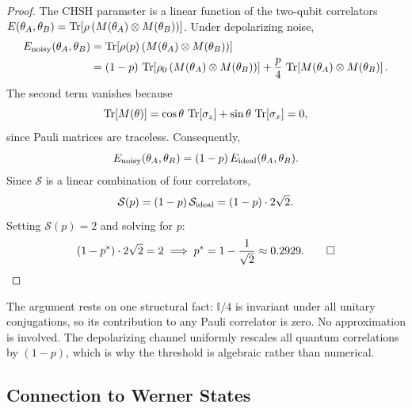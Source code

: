 \documentclass[12pt]{article}
\newcommand{\pstar}{p^*}
\newcommand{\bigS}{\mathcal{S}}
\newcommand{\Id}{\mathbb{I}}
\begin{document}
\begin{proof}
The CHSH parameter is a linear function of the two-qubit correlators
$E(\theta_A,\theta_B) = \Tr[\rho\,(M(\theta_A)\otimes M(\theta_B))]$.
Under depolarizing noise,
\begin{align}
  E_{\rm noisy}(\theta_A,\theta_B)
    &= \Tr\!\left[\rho(p)\,(M(\theta_A)\otimes M(\theta_B))\right] \notag\\
    &= (1-p)\,\Tr\!\left[\rho_0\,(M(\theta_A)\otimes M(\theta_B))\right]
      + \frac{p}{4}\,\Tr\!\left[M(\theta_A)\otimes M(\theta_B)\right].
  \label{eq:e_noisy}
\end{align}
The second term vanishes because
\begin{equation}
  \Tr[M(\theta)] = \cos\theta\,\Tr[\sigma_z] + \sin\theta\,\Tr[\sigma_x] = 0,
  \label{eq:trace_vanish}
\end{equation}
since Pauli matrices are traceless.
Consequently,
\begin{equation}
  E_{\rm noisy}(\theta_A,\theta_B) = (1-p)\,E_{\rm ideal}(\theta_A,\theta_B).
  \label{eq:e_rescale}
\end{equation}
Since $\bigS$ is a linear combination of four correlators,
\begin{equation}
  \bigS(p) = (1-p)\,\bigS_{\rm ideal} = (1-p)\cdot 2\sqrt{2}.
  \label{eq:s_linear}
\end{equation}
Setting $\bigS(p) = 2$ and solving for $p$:
\begin{equation}
  (1-\pstar)\cdot 2\sqrt{2} = 2
  \;\Longrightarrow\;
  \pstar = 1 - \frac{1}{\sqrt{2}} \approx 0.2929. \qed
  \label{eq:pstar_derivation}
\end{equation}
\end{proof}

The argument rests on one structural fact: $\Id/4$ is invariant under all unitary conjugations,
so its contribution to any Pauli correlator is zero. No approximation is involved. The depolarizing
channel uniformly rescales all quantum correlations by $(1-p)$, which is why the threshold is
algebraic rather than numerical.

\subsection{Connection to Werner States}
\label{subsec:werner}
\end{document}
